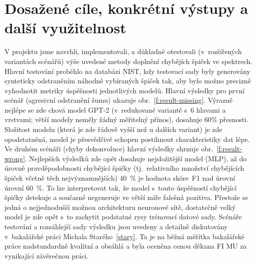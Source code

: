 \documentclass[a4paper,11pt]{article}
\begin{document}









\section{Dosažené cíle, konkrétní výstupy a další využitelnost}
\label{cile}



V projektu jsme navrhli, implementovali, a důkladně otestovali (v~rozšířených variantách scénářů)
výše uvedené metody doplnění chybějích špiček ve spektrech.
Hlavní testování proběhlo na databázi NIST, kdy testovací sady byly generovány synteticky
odstraněním náhodně vybíraných špiček tak, aby bylo možno precizně vyhodnotit metriky 
úspěšnosti jednotlivých modelů.
Hlavní výsledky pro první scénář (agresivní odstranění šumu) ukazuje obr.~\ref{f:result-missing}.
Výrazně nejlépe se zde chová model GPT-2 (v~redukované variantě s~6 hlavami a vrstvami; větší modely neměly
žádný měřitelný přínos), dosahuje 60\% přesnosti.
Složitost modelu (která je zde řádově vyšší než u dalších variant) je zde opodstatněná,
model je přesvědčivě schopen postihnout charakteristiky dat lépe.
Ve druhém scénáři (chyby dekonvoluce) hlavní výsledky shrnuje obr.~\ref{f:result-wrong}.
Nejlepších výsledků zde opět dosahuje nejsložitější model (MLP), až do úrovně pravděpodobnosti chybějící špičky
(tj.\ relativního množství chybějících špiček včetně těch nejvýznamnějších) 40~\% je hodnota skóre~F1 nad úrovní
úrovní 60~\%. To lze interpretovat tak, že model s~touto úspěšností chybějící špičky detekuje
a současně negeneruje ve větší míře falešná pozitiva.
Přestože se jedná o nejjednodušší možnou architekturu neuronové sítě, dostatečně velký model
je zde opět s~to zachytit podstatné rysy trénovací datové sady.
Scénáře testování a rozsáhlejší sady výsledku jsou uvedeny a detailně diskutovány v~bakalářské práci Michala Starého~\ref{stary}.
Ta je na běžná měřítka bakalářské práce nadstandardně kvalitní a obsáhlá 
a byla oceněna cenou děkana FI MU za vynikající závěrečnou práci.
\end{document}
